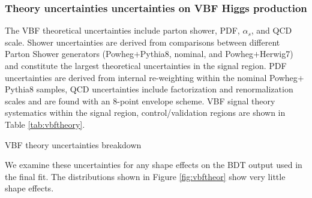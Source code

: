 \subsubsection{Theory uncertainties uncertainties on VBF Higgs production}
The VBF theoretical uncertainties include parton shower, PDF, $\alpha_s$, and QCD scale. Shower uncertainties are derived from comparisons between different Parton Shower generators (Powheg$+$Pythia8, nominal, and Powheg$+$Herwig7) and constitute the largest theoretical uncertainties in the signal region. PDF uncertainties are derived from internal re-weighting within the nominal Powheg$+$Pythia8 samples, QCD uncertainties include factorization and renormalization scales and are found with an 8-point envelope scheme. VBF signal theory systematics within the signal region, control/validation regions are shown in Table \ref{tab:vbftheory}.

\begin{table}[h!]
\centering
\scalebox{1.0}{

}
\caption{VBF theory uncertainties breakdown}
\label{tab:vbftheory}
\end{table}

We examine these uncertainties for any shape effects on the BDT output used in the final fit. The distributions shown in Figure \ref{fig:vbftheor} show very little shape effects.

